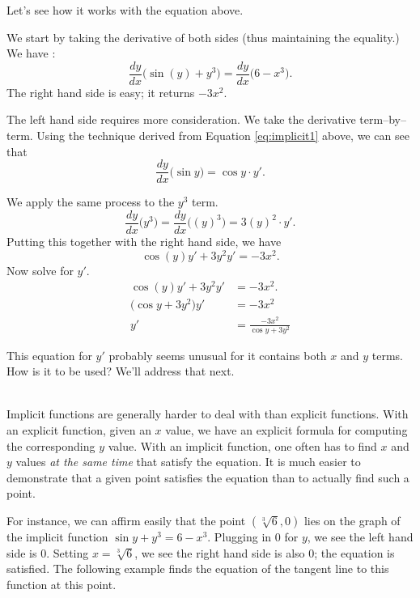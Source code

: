 Let's see how it works with the equation above.\\

{We start by taking the derivative of both sides (thus maintaining the equality.) We have :
$$ \frac{dy}{dx}\Big(\sin(y) + y^3\Big)=\frac{dy}{dx}\Big(6-x^3\Big).$$
The right hand side is easy; it returns $-3x^2$. 

The left hand side requires more consideration. We take the derivative term--by--term.  Using the technique derived from Equation \ref{eq:implicit1} above, we can see that $$\frac{dy}{dx}\Big(\sin y\Big) = \cos y \cdot y'.$$ %

We apply the same process to the $y^3$ term. 
$$\frac{dy}{dx}\Big(y^3\Big) = \frac{dy}{dx}\Big((y)^3\Big) = 3(y)^2\cdot y'.$$
Putting this together with the right hand side, we have
$$\cos(y)y'+3y^2y' = -3x^2.$$
Now solve for $y'$.
		\begin{align*}
		\cos(y)y'+3y^2y' 	&= -3x^2.\\
		\big(\cos y+3y^2\big)y' &=	-3x^2\\
		y'&=	\frac{-3x^2}{\cos y+3y^2}
		\end{align*}

This equation for $y'$ probably seems unusual for it contains both $x$ and $y$ terms. How is it to be used? We'll address that next.}\\

Implicit functions are generally harder to deal with than explicit functions. With an explicit function, given an $x$ value, we have an explicit formula for computing the corresponding $y$ value. With an implicit function, one often has to find $x$ and $y$ values \textit{at the same time} that satisfy the equation. It is much easier to demonstrate that a given point satisfies the equation than to actually find such a point.

For instance, we can affirm easily that the point $(\sqrt[3]{6},0)$ lies on the graph of the implicit function $\sin y + y^3=6-x^3$. Plugging in $0$ for $y$, we see the left hand side is $0$. Setting $x=\sqrt[3]6$, we see the right hand side is also $0$; the equation is satisfied. The following example finds the equation of the tangent line to this function at this point.\\

